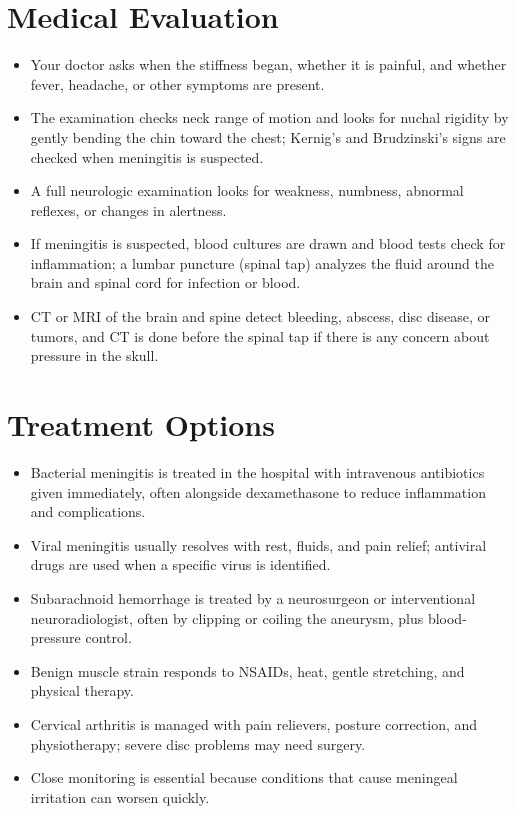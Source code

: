 \section*{Medical Evaluation}
\begin{itemize}
  \item Your doctor asks when the stiffness began, whether it is painful, and whether fever, headache, or other symptoms are present.
  \item The examination checks neck range of motion and looks for nuchal rigidity by gently bending the chin toward the chest; Kernig's and Brudzinski's signs are checked when meningitis is suspected.
  \item A full neurologic examination looks for weakness, numbness, abnormal reflexes, or changes in alertness.
  \item If meningitis is suspected, blood cultures are drawn and blood tests check for inflammation; a lumbar puncture (spinal tap) analyzes the fluid around the brain and spinal cord for infection or blood.
  \item CT or MRI of the brain and spine detect bleeding, abscess, disc disease, or tumors, and CT is done before the spinal tap if there is any concern about pressure in the skull.
\end{itemize}

\section*{Treatment Options}
\begin{itemize}
  \item Bacterial meningitis is treated in the hospital with intravenous antibiotics given immediately, often alongside dexamethasone to reduce inflammation and complications.
  \item Viral meningitis usually resolves with rest, fluids, and pain relief; antiviral drugs are used when a specific virus is identified.
  \item Subarachnoid hemorrhage is treated by a neurosurgeon or interventional neuroradiologist, often by clipping or coiling the aneurysm, plus blood-pressure control.
  \item Benign muscle strain responds to NSAIDs, heat, gentle stretching, and physical therapy.
  \item Cervical arthritis is managed with pain relievers, posture correction, and physiotherapy; severe disc problems may need surgery.
  \item Close monitoring is essential because conditions that cause meningeal irritation can worsen quickly.
\end{itemize}


